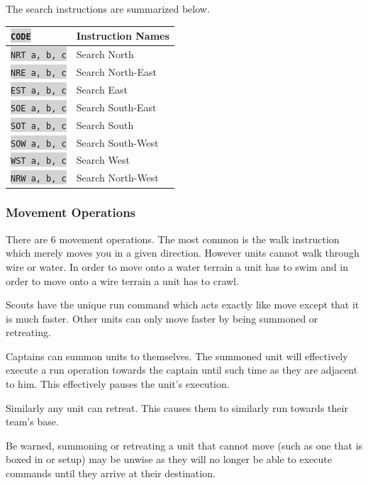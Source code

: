 \documentclass{article}
\newcommand{\vnscode}[1]{\colorbox{lightgray}{\lstinline[language=vns]{#1}}}
\begin{document}
The search instructions are summarized below.

\begin{minipage}{\textwidth}
\label{table:search}
\centering
\begin{tabular}{ll}
    \hline \vnscode{CODE} & Instruction Names \\ \hline
    \vnscode{NRT a, b, c} & Search North \\
    \vnscode{NRE a, b, c} & Search North-East \\
    \vnscode{EST a, b, c} & Search East \\
    \vnscode{SOE a, b, c} & Search South-East \\
    \vnscode{SOT a, b, c} & Search South \\
    \vnscode{SOW a, b, c} & Search South-West \\
    \vnscode{WST a, b, c} & Search West \\
    \vnscode{NRW a, b, c} & Search North-West \\
\end{tabular}
\end{minipage}

\subsubsection{Movement Operations}

There are 6 movement operations. The most common is the walk instruction which
merely moves you in a given direction. However units cannot walk through wire or
water. In order to move onto a water terrain a unit has to swim and in order to
move onto a wire terrain a unit has to crawl.

Scouts have the unique run command which acts exactly like move except that it
is much faster. Other units can only move faster by being summoned or
retreating.

Captains can summon units to themselves. The summoned unit will effectively
execute a run operation towards the captain until such time as they are adjacent
to him. This effectively pauses the unit's execution.

Similarly any unit can retreat. This causes them to similarly run towards their
team's base.

Be warned, summoning or retreating a unit that cannot move (such as one that is
boxed in or setup) may be unwise as they will no longer be able to execute
commands until they arrive at their destination.
\end{document}
